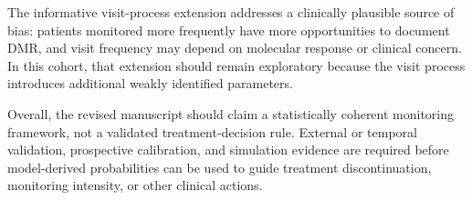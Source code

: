 The informative visit-process extension addresses a clinically plausible source of bias: patients monitored more frequently have more opportunities to document DMR, and visit frequency may depend on molecular response or clinical concern. In this cohort, that extension should remain exploratory because the visit process introduces additional weakly identified parameters.

Overall, the revised manuscript should claim a statistically coherent monitoring framework, not a validated treatment-decision rule. External or temporal validation, prospective calibration, and simulation evidence are required before model-derived probabilities can be used to guide treatment discontinuation, monitoring intensity, or other clinical actions.
